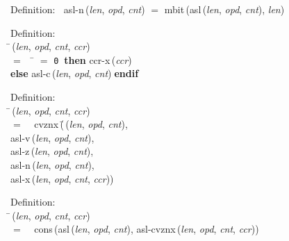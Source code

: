 \begin{tabbing}{\sc Definition}:$\;\;$
{\rm{asl-n}}\,({\it{len\/}}, {\it{opd\/}}, {\it{cnt\/}}) $=$ {\rm{mbit}}\,({\rm{asl}}\,({\it{len\/}}, {\it{opd\/}}, {\it{cnt\/}}), {\it{len\/}})
\end{tabbing}

\begin{tabbing}{\sc Definition}: \\  
\=\,({\it{len\/}}, {\it{opd\/}}, {\it{cnt\/}}, {\it{ccr\/}}) \\ 
$=$$\;\;\;\;$\= $=$ {\tt{0}}$\;\;${\bf then }{\rm{ccr-x}}\,({\it{ccr\/}}) \\ 
{\bf else }{\rm{asl-c}}\,({\it{len\/}}, {\it{opd\/}}, {\it{cnt\/}})$\;${\bf  endif}\-\-
\end{tabbing}

\begin{tabbing}{\sc Definition}: \\  
\=\,({\it{len\/}}, {\it{opd\/}}, {\it{cnt\/}}, {\it{ccr\/}}) \\ 
$=$$\;\;\;\;${\rm{cvznx}}\,(\=\,({\it{len\/}}, {\it{opd\/}}, {\it{cnt\/}}), \\ 
{\rm{asl-v}}\,({\it{len\/}}, {\it{opd\/}}, {\it{cnt\/}}), \\ 
{\rm{asl-z}}\,({\it{len\/}}, {\it{opd\/}}, {\it{cnt\/}}), \\ 
{\rm{asl-n}}\,({\it{len\/}}, {\it{opd\/}}, {\it{cnt\/}}), \\ 
{\rm{asl-x}}\,({\it{len\/}}, {\it{opd\/}}, {\it{cnt\/}}, {\it{ccr\/}}))\-\-
\end{tabbing}

\begin{tabbing}{\sc Definition}: \\  
\=\,({\it{len\/}}, {\it{opd\/}}, {\it{cnt\/}}, {\it{ccr\/}}) \\ 
$=$$\;\;\;\;${\rm{cons}}\,({\rm{asl}}\,({\it{len\/}}, {\it{opd\/}}, {\it{cnt\/}}), {\rm{asl-cvznx}}\,({\it{len\/}}, {\it{opd\/}}, {\it{cnt\/}}, {\it{ccr\/}}))\-
\end{tabbing}

